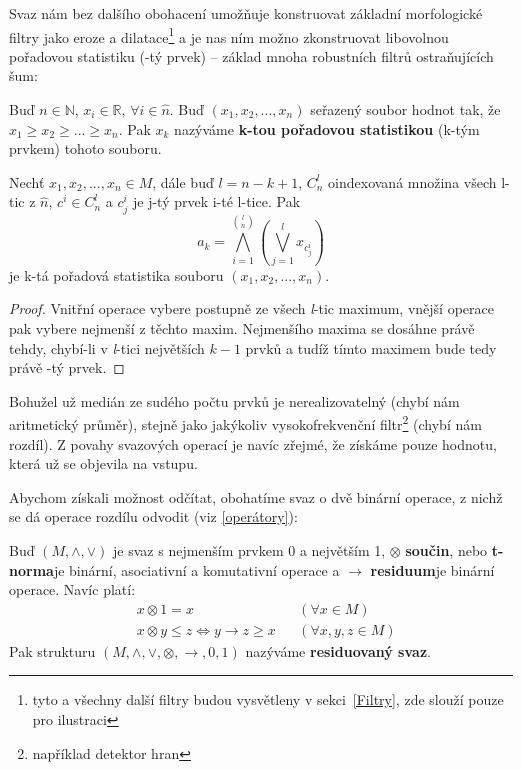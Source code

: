     Svaz nám bez dalšího obohacení umožňuje konstruovat základní morfologické filtry jako eroze a dilatace\footnote{tyto a všechny další filtry budou vysvětleny v sekci~\ref{Filtry}, zde slouží pouze pro ilustraci} a je nas ním možno zkonstruovat libovolnou pořadovou statistiku (\kk-tý prvek) -- základ mnoha robustních filtrů ostraňujících šum:
    
    \begin{define}\label{def k-prvek}
      Buď $n \in \mathbb{N}$, $x_i \in \mathbb{R}, \,\forall i \in \widehat n$. Buď $(x_1,x_2,...,x_n)$ seřazený soubor hodnot tak, že $x_1 \geq x_2 \geq ... \geq x_n$. Pak $x_k$ nazýváme \textbf{k-tou pořadovou statistikou} (k-tým prvkem) tohoto souboru.
    \end{define}

    \begin{theo}\label{theo k-tý prvek}
      Nechť $x_1,x_2,...,x_n \in M$, dále buď $l = n-k+1$, $C^{l}_n$ oindexovaná množina všech l-tic z $\widehat n$, $c^i \in C^{l}_n$ a $c^i_j$ je j-tý prvek i-té l-tice. Pak
      \[
        a_k = \bigwedge_{i = 1}^{{l}\choose{n}}\left( \bigvee_{j = 1}^{l} x_{c_{j}^i} \right)
      \]
      je k-tá pořadová statistika souboru $(x_1,x_2,...,x_n)$.
    \end{theo}
    \begin{proof}
      Vnitřní operace vybere postupně ze všech \textit{l}-tic maximum, vnější operace pak vybere nejmenší z těchto maxim. Nejmenšího maxima se dosáhne právě tehdy, chybí-li v \textit{l}-tici největších $k-1$ prvků a tudíž tímto maximem bude tedy právě \kk-tý prvek.
    \end{proof}

    Bohužel už medián ze sudého počtu prvků je nerealizovatelný (chybí nám aritmetický průměr), stejně jako jakýkoliv vysokofrekvenční filtr\footnote{například detektor hran} (chybí nám rozdíl). Z povahy svazových operací je navíc zřejmé, že získáme pouze hodnotu, která už se objevila na vstupu.

    Abychom získali možnost odčítat, obohatíme svaz o dvě binární operace, z nichž se dá operace rozdílu odvodit (viz \ref{operátory}):

    \begin{define}\label{def residuovaný svaz}
    Buď $(M,\wedge,\vee)$ je svaz s nejmenším prvkem 0 a největším 1, $\otimes$ \rl \textbf{součin}, nebo \textbf{t-norma}\rr je binární, asociativní a komutativní operace a $\rightarrow$ \rl \textbf{residuum}\rr je binární operace. Navíc platí:
    \begin{align}
    &x \otimes 1 = x  &&(\forall x \in M)\\
    &x \otimes y \leq z \Leftrightarrow y \rightarrow z \geq x &&(\forall x,y,z \in M)\label{Galoisova koresp}
    \end{align}
    Pak strukturu $(M,\wedge,\vee,\otimes,\rightarrow,0,1)$ nazýváme \textbf{residuovaný svaz}.
    \end{define}

